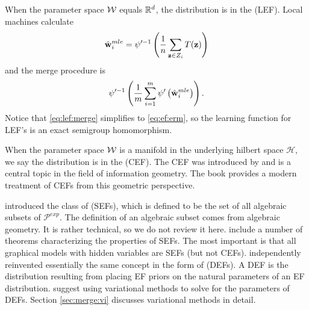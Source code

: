 \documentclass[thesis.tex]{subfiles}
\newcommand{\set}[1]{\mathcal {#1}}
\newcommand{\p}[1]{p\left({#1}\right)}
\newcommand{\Pdist}{\mathcal P}
\newcommand{\Pexp}{\Pdist^\textit{exp}}
\begin{document}
\begin{method}
    When the parameter space ${\mathcal W}$ equals $\mathbb R^d$,
    the distribution is in the  (LEF).
    Local machines calculate 
    \begin{equation}
        \hat{\mathbf w}^{mle}_i
        = \psi'^{-1} \left(\frac{1}{n} \sum_{\mathbf z\in Z_i} T(\mathbf z) \right)
    \end{equation}
    and the merge procedure is
    \begin{equation}
        \label{eq:lef:merge}
        \psi'^{-1} 
        \left(
            \frac{1}{m} \sum_{i=1}^m \psi' \left(\hat{\mathbf w}^{mle}_i\right)
        \right)
        .
    \end{equation}
    Notice that \eqref{eq:lef:merge} simplifies to \eqref{eq:ef:erm},
    so the learning function for LEF's is an exact semigroup homomorphism.
\end{method}

When the parameter space ${\mathcal W}$ is a manifold in the underlying hilbert space $\set H$,
we say the distribution is in the  (CEF). 
The CEF was introduced by \citet{efron1975defining} and is a central topic in the field of information geometry.
The book \citet{amari2016information} provides a modern treatment of CEFs from this geometric perspective.

%


\citet{geiger2001stratified} introduced the class of  (SEFs),
which is defined to be the set of all algebraic subsets of $\Pexp$.
The definition of an algebraic subset comes from algebraic geometry.
It is rather technical, so we do not review it here.
\citet{geiger2001stratified} include a number of theorems characterizing the properties of SEFs.
The most important is that all graphical models with hidden variables are SEFs (but not CEFs).
\cite{ranganath2015deep} independently reinvented essentially the same concept in the form of  (DEFs).
A DEF is the distribution resulting from placing EF priors on the natural parameters of an EF distribution.
\citet{ranganath2015deep} suggest using variational methods to solve for the parameters of DEFs.
Section \ref{sec:merge:vi} discusses variational methods in detail.
\end{document}
